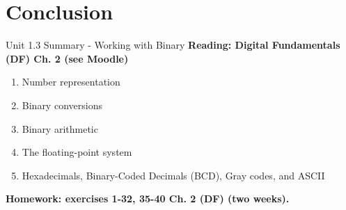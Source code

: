 \documentclass{beamer}
\begin{document}
\section{Conclusion}

\begin{frame}{Unit 1.3 Summary - Working with Binary}
\textbf{Reading: Digital Fundamentals (DF) Ch. 2 (see Moodle)}
\begin{enumerate}
\item Number representation
\item Binary conversions
\item Binary arithmetic
\item The floating-point system
\item Hexadecimals, Binary-Coded Decimals (BCD), Gray codes, and ASCII
\end{enumerate}
\textbf{Homework: exercises 1-32, 35-40 Ch. 2 (DF) (two weeks).}
\end{frame}
\end{document}
